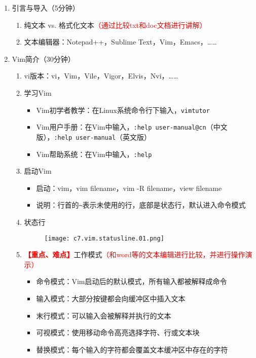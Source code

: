 \documentclass{TIJMUjiaoanLL}
\begin{document}
\firstTail


\newpage
\otherHeader

\begin{enumerate}
  \item 引言与导入（5分钟）
    \begin{enumerate}
      \item 纯文本 vs.  格式化文本\textcolor{red}{（通过比较txt和doc文档进行讲解）}
      \item 文本编辑器：Notepad++，Sublime Text，Vim，Emacs，……
    \end{enumerate}

  \item Vim简介（30分钟）
    \begin{enumerate}
      \item vi版本：vi，Vim，Vile，Vigor，Elvis，Nvi，……
      \item 学习Vim
	\begin{itemize}
          \item Vim初学者教学：在Linux系统命令行下输入，\verb|vimtutor|
          \item Vim用户手册：在Vim中输入，\verb|:help user-manual@cn|（中文版），\verb|:help user-manual|（英文版）
          \item Vim帮助系统：在Vim中输入，\verb|:help|
	\end{itemize}
      \item 启动Vim
	\begin{itemize}
	  \item 启动：vim，vim filename，vim -R filename，view filename
	  \item 说明：行首的\verb|~|表示未使用的行，底部是状态行，默认进入命令模式
	\end{itemize}
      \item 状态行
    \vspace*{-10pt}
    \begin{figure}[h]
      \centering
      \texttt{[image: c7.vim.statusline.01.png]}
    \end{figure}
    \vspace*{-10pt}
      \item
	\textcolor{red}{\textbf{【重点、难点】}}工作模式\textcolor{red}{（和word等的文本编辑进行比较，并进行操作演示）}
	\begin{itemize}
	  \item 命令模式：Vim启动后的默认模式，所有输入都被解释成命令
	  \item 输入模式：大部分按键都会向缓冲区中插入文本
	  \item 末行模式：可以输入会被解释并执行的文本
	  \item 可视模式：使用移动命令高亮选择字符、行或文本块
	  \item 替换模式：每个输入的字符都会覆盖文本缓冲区中存在的字符
	\end{itemize}
    \end{enumerate}


\end{enumerate}
\end{document}
